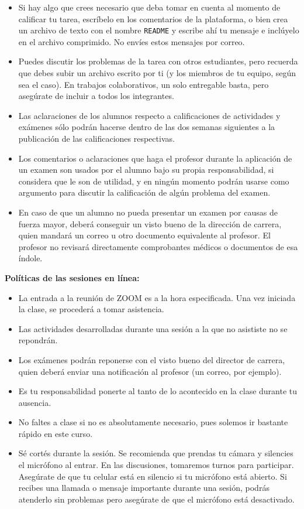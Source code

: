 \documentclass[12pt, letterpaper, oneside]{article}
\begin{document}
\begin{itemize}
  \item Si hay algo que crees necesario que deba tomar en cuenta al momento de calificar tu tarea, escríbelo en los comentarios de la plataforma, o bien crea un archivo de texto con el nombre \texttt{README} y escribe ahí tu mensaje e inclúyelo en el archivo comprimido. No envíes estos mensajes por correo.
  \item Puedes discutir los problemas de la tarea con otros estudiantes, pero recuerda que debes subir un archivo escrito por ti (y los miembros de tu equipo, según sea el caso). En trabajos colaborativos, un solo entregable basta, pero asegúrate de incluir a todos los integrantes.
  \item Las aclaraciones de los alumnos respecto a calificaciones de actividades y exámenes sólo podrán hacerse dentro de las dos semanas siguientes a la publicación de las calificaciones respectivas.
  \item Los comentarios o aclaraciones que haga el profesor durante la aplicación de un examen son usados por el alumno bajo su propia responsabilidad, si considera que le son de utilidad, y en ningún momento podrán usarse como argumento para discutir la calificación de algún problema del examen.
  \item En caso de que un alumno no pueda presentar un examen por causas de fuerza mayor, deberá conseguir un visto bueno de la dirección de carrera, quien mandará un correo u otro documento equivalente al profesor. El profesor no revisará directamente comprobantes médicos o documentos de esa índole.
  \end{itemize}

  \pagebreak
  \noindent\textbf{Políticas de las sesiones en línea:}  
  \begin{itemize}
  \item La entrada a la reunión de ZOOM es a la hora especificada. Una vez iniciada la clase, se procederá a tomar asistencia.
  \item Las actividades desarrolladas durante una sesión a la que no asististe no se repondrán.
  \item Los exámenes podrán reponerse con el visto bueno del director de carrera, quien deberá enviar una notificación al profesor (un correo, por ejemplo).
  \item Es tu responsabilidad ponerte al tanto de lo acontecido en la clase durante tu ausencia.
  \item No faltes a clase si no es absolutamente necesario, pues solemos ir bastante rápido en este curso.
  \item Sé cortés durante la sesión. Se recomienda que prendas tu cámara y silencies el micrófono al entrar. En las discusiones, tomaremos turnos para participar. Asegúrate de que tu celular está en silencio si tu micrófono está abierto. Si recibes una llamada o mensaje importante durante una sesión, podrás atenderlo sin problemas pero asegúrate de que el micrófono está desactivado.\footnotemark
  \end{itemize}
\end{document}
